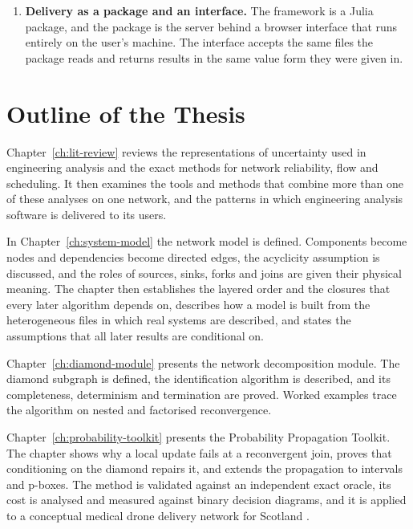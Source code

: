\documentclass[12pt]{report}
\begin{document}
\begin{enumerate}
    classical critical path method is one instance of a family of analyses defined by a pair
    of operators. A backward pass exists only for pairs whose algebra supports one. For
    interval durations the forward quantities are computed exactly by two runs at the corners
    of the input box. The floats are computed exactly by a domination split that reduces
    the enumeration from every uncertain duration to the durations that can bypass the node in
    question.
  \item \textbf{Delivery as a package and an interface.} The framework is a Julia package, and
    the package is the server behind a browser interface that runs entirely on the user's
    machine. The interface accepts the same files the package reads and returns results in the
    same value form they were given in.
\end{enumerate}

\section{Outline of the Thesis}
\label{sec:intro-structure}

Chapter~\ref{ch:lit-review} reviews the representations of uncertainty used in engineering
analysis and the exact methods for network reliability, flow and scheduling. It then examines
the tools and methods that combine more than one of these analyses on one network, and the
patterns in which engineering analysis software is delivered to its users.

In Chapter~\ref{ch:system-model} the network model is defined. Components become nodes and
dependencies become directed edges, the acyclicity assumption is discussed, and the roles of
sources, sinks, forks and joins are given their physical meaning. The chapter then establishes
the layered order and the closures that every later algorithm depends on, describes how a model
is built from the heterogeneous files in which real systems are described, and states the
assumptions that all later results are conditional on.

Chapter~\ref{ch:diamond-module} presents the network decomposition module. The diamond subgraph
is defined, the identification algorithm is described, and its completeness, determinism and
termination are proved. Worked examples trace the algorithm on nested and factorised
reconvergence.

Chapter~\ref{ch:probability-toolkit} presents the Probability Propagation Toolkit. The chapter
shows why a local update fails at a reconvergent join, proves that conditioning on the diamond
repairs it, and extends the propagation to intervals and p-boxes. The method is validated
against an independent exact oracle, its cost is analysed and measured against binary decision
diagrams, and it is applied to a conceptual medical drone delivery network for Scotland
\cite{jones2025conceptual}.
\end{document}
